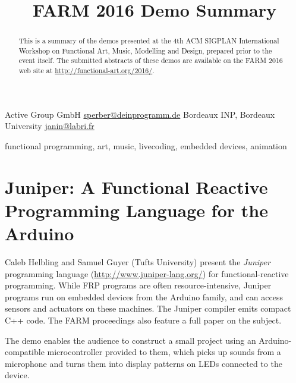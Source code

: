 \documentclass{sigplanconf}
\begin{document}
\toappear

\setlength{\pdfpageheight}{\paperheight}
\setlength{\pdfpagewidth}{\paperwidth}


\title{FARM 2016 Demo Summary}

           {Active Group GmbH}
           {\url{sperber@deinprogramm.de}}
           {Bordeaux INP, Bordeaux University}
           {\url{janin@labri.fr}}

\maketitle

\begin{abstract}
  This is a summary of the demos presented at the 4th ACM SIGPLAN
  International Workshop on Functional Art, Music, Modelling and
  Design, prepared prior to the event itself.  The submitted abstracts
  of these demos are available on the FARM 2016 web site at
  \url{http://functional-art.org/2016/}.
\end{abstract}


\keywords
functional programming, art, music, livecoding, embedded devices, animation

\section{Juniper: A Functional Reactive Programming Language for the Arduino}

Caleb Helbling and Samuel Guyer (Tufts University) present the
\textit{Juniper} programming language (\url{http://www.juniper-lang.org/}) for functional-reactive
programming.  While FRP programs are often resource-intensive, Juniper
programs run on embedded devices from the Arduino family, and can
access sensors and actuators on these machines.  The Juniper compiler
emits compact C++ code.  The FARM proceedings also feature a full
paper on the subject.

The demo enables the audience to construct a small project using an
Arduino-compatible microcontroller provided to them, which
picks up sounds from a microphone and turns them into display patterns
on LEDs connected to the device.
\end{document}

